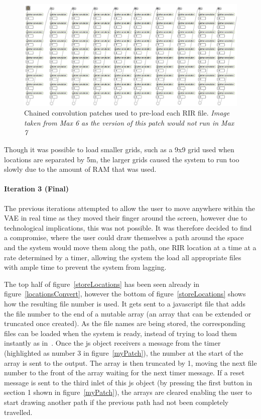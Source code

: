 \documentclass[../../main.tex]{subfiles}
\begin{document}
			\begin{figure}[H]
				\centerline{\includegraphics[scale = 0.4]{Sections/Implementation/Max/images/Max/Iteration2/preload.png}}
				\caption{Chained convolution patches used to pre-load each \ac{RIR} file. \textit{Image taken from Max 6 as the version of this patch would not run in Max 7}}
				\label{preload}
			\end{figure}


			Though it was possible to load smaller grids, such as a 9x9 grid used when locations are separated by 5m, the larger grids caused the system to run too slowly due to the amount of RAM that was used.

		 \paragraph{Iteration 3 (Final)}
		 \label{iteration3}

		 	The previous iterations attempted to allow the user to move anywhere within the \ac{VAE} in real time as they moved their finger around the screen, however due to technological implications, this was not possible. It was therefore decided to find a compromise, where the user could draw themselves a path around the space and the system would move them along the path, one \ac{RIR} location at a time at a rate determined by a timer, allowing the system the load all appropriate files with ample time to prevent the system from lagging.

		 	The top half of figure~\ref{storeLocations} has been seen already in figure~\ref{locationsConvert}, however the bottom of figure~\ref{storeLocations} shows how the resulting file number is used. It gets sent to a javascript file that adds the file number to the end of a mutable array (an array that can be extended or truncated once created). As the file names are being stored, the corresponding files can be loaded when the system is ready, instead of trying to load them instantly as in~. Once the js object receivers a message from the timer (highlighted as number 3 in figure~\ref{myPatch}), the number at the start of the array is sent to the output. The array is then truncated by 1, moving the next file number to the front of the array waiting for the next timer message. If a reset message is sent to the third inlet of this js object (by pressing the first button in section 1 shown in figure~\ref{myPatch}), the arrays are cleared enabling the user to start drawing another path if the previous path had not been completely travelled.
\end{document}
